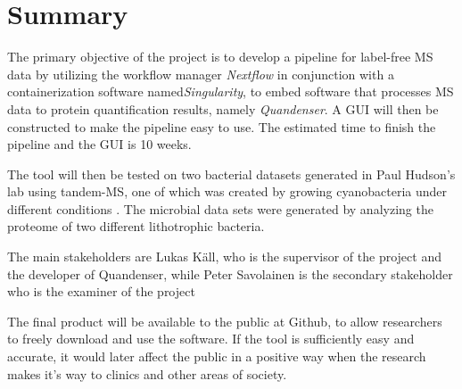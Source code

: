 \section{Summary}

The primary objective of the project is to develop a pipeline for label-free MS data by utilizing the workflow manager \textit{Nextflow} in conjunction with a containerization software named\textit{Singularity}, to embed software that processes MS data to protein quantification results, namely \textit{Quandenser}. A GUI will then be constructed to make the pipeline easy to use. The estimated time to finish the pipeline and the GUI is 10 weeks.

The tool will then be tested on two bacterial datasets generated in Paul Hudson’s lab using tandem-MS, one of which was created by growing cyanobacteria under different conditions \cite{michael}. The microbial data sets were generated by analyzing the proteome of two different lithotrophic bacteria.

The main stakeholders are Lukas Käll, who is the supervisor of the project and the developer of Quandenser, while Peter Savolainen is the secondary stakeholder who is the examiner of the project

The final product will be available to the public at Github, to allow researchers to freely download and use the software. If the tool is sufficiently easy and accurate, it would later affect the public in a positive way when the research makes it's way to clinics and other areas of society.
